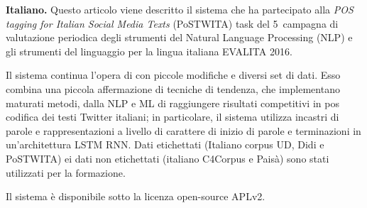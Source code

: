 \documentclass[11pt]{article}
\title{\mytitle}
\author{Egon W.~Stemle \\
    Institute for Specialised Communication and Multilingualism \\
    EURAC Research \\
    Bolzano/Bozen, Italy
    {\tt egon.stemle@eurac.edu}}
\date{}
\begin{document}
\maketitle

\begin{abstract} %
\textbf{English.}  
This article describes the system that participated in the \emph{POS tagging
for Italian Social Media Texts} (PoSTWITA) task of the 5\textsuperscript{th}
periodic evaluation campaign of Natural Language Processing (NLP) and speech
tools for the Italian language EVALITA 2016.

The work is a continuation of  with minor
modifications to the system and different data sets.  
It combines a small assertion of trending techniques, which implement matured
methods, from NLP and ML to achieve competitive results on PoS tagging of
Italian Twitter texts; in particular, the system uses word embeddings and
character-level representations of word beginnings and endings in a LSTM RNN
architecture.  
Labelled data (Italian UD corpus, DiDi and PoSTWITA) and unlabbelled data
(Italian C4Corpus and PAIS{\`A}) were used for training.

The system is available under the APLv2 open-source license.
\end{abstract}

\begin{abstract-alt}
\textrm{\bf{Italiano.}}
Questo articolo viene descritto il sistema che ha partecipato alla \emph{POS
tagging for Italian Social Media Texts} (PoSTWITA) task del
5\textdegree~campagna di valutazione periodica degli strumenti del Natural
Language Processing (NLP) e gli strumenti del linguaggio per la lingua italiana
EVALITA 2016.

Il sistema continua l'opera di  con piccole
modifiche e diversi set di dati. 
Esso combina una piccola affermazione di tecniche di tendenza, che implementano
maturati metodi, dalla NLP e ML di raggiungere risultati competitivi in pos
codifica dei testi Twitter italiani; in particolare, il sistema utilizza
incastri di parole e rappresentazioni a livello di carattere di inizio di
parole e terminazioni in un'architettura LSTM RNN. 
Dati etichettati (Italiano corpus UD, Didi e PoSTWITA) ei dati non etichettati
(italiano C4Corpus e Paisà) sono stati utilizzati per la formazione.

Il sistema è disponibile sotto la licenza open-source APLv2.
\end{abstract-alt}
\end{document}
